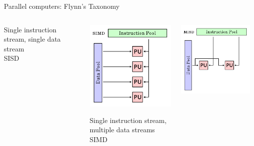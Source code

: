 \documentclass[xcolor={svgnames,usenames}]{beamer}
\begin{document}
\begin{frame}{Parallel computers: Flynn's Taxonomy}
\begin{itemize}
\begin{columns}
\begin{column}{0.25\columnwidth}
		Single instruction stream, single data stream\\SISD
		\end{column}
			\begin{column}{0.25\columnwidth}
						\centering
				\small
	\includegraphics[width=\columnwidth]{SIMD.png}
	
	\alert<6>{Single instruction stream, multiple data streams\\SIMD}
	\end{column}
		\begin{column}{0.25\columnwidth}
					\centering
			\small
	\includegraphics[width=\columnwidth]{MISD.png}
			

\end{column}
\end{columns}
\end{itemize}
\end{frame}
\end{document}
